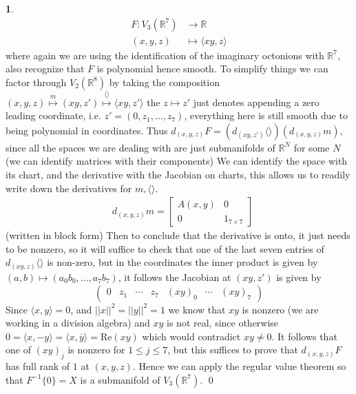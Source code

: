 \documentclass[10.5pt]{article}
\theoremstyle{definition}
\newtheorem{pb}{}
\newcommand{\set}[1]{\{#1\}}
\newcommand{\gen}[1]{\langle#1\rangle}
\newcommand{\norm}[1]{\lvert\lvert#1\rvert\rvert}
\begin{document}
\begin{pb}
\begin{align*}
            F: V_3(\mathbb{R}^7) &\to \mathbb{R} \\
            (x,y,z) &\mapsto \gen{xy,z}
        \end{align*}
        where again we are using the identification of the imaginary octonions with \(\mathbb{R}^7\), also recognize that \(F\) is polynomial hence smooth. To simplify things we can factor through \(V_2(\mathbb{R}^8)\) by taking the composition \((x,y,z) \overset{m}{\mapsto} (xy,z') \overset{\gen{}}{\mapsto} \gen{xy,z'}\) the \(z \mapsto z'\) just denotes appending a zero leading coordinate, i.e. \(z' = (0,z_1,\hdots,z_7)\), everything here is still smooth due to being polynomial in coordinates. Thus \(d_{(x,y,z)}F = (d_{(xy,z')}\gen{})(d_{(x,y,z)}m)\), since all the spaces we are dealing with are just submanifolds of \(\mathbb{R}^N\) for some \(N\) (we can identify matrices with their components) We can identify the space with its chart, and the derivative with the Jacobian on charts, this allows us to readily write down the derivatives for \(m, \gen{}\).
        \begin{align*}
            &d_{(x,y,z)}m = \begin{bmatrix} A(x,y) & 0 \\ 0 & 1_{7 \times 7} \end{bmatrix}
        \end{align*}
        (written in block form) Then to conclude that the derivative is onto, it just needs to be nonzero, so it will suffice to check that one of the last seven entries of \(d_{(xy,z)} \gen{}\) is non-zero, but in the coordinates the inner product is given by \((a,b) \mapsto (a_0b_0,\hdots,a_7b_7)\), it follows the Jacobian at \((xy,z')\) is given by \[\begin{pmatrix} 0&z_1&\cdots&z_7 &(xy)_0 &\cdots &(xy)_7 \end{pmatrix}\]
        Since \(\gen{x,y} = 0\), and \(\norm{x}^2 = \norm{y}^2 = 1\) we know that \(xy\) is nonzero (we are working in a division algebra) and \(xy\) is not real, since otherwise \(0 = \gen{x,-y} = \gen{x, \overline{y}} = \text{Re}(xy)\) which would contradict \(xy \neq 0\). It follows that one of \((xy)_j\) is nonzero for \(1 \leq j \leq 7\), but this suffices to prove that \(d_{(x,y,z)}F\) has full rank of \(1\) at \((x,y,z)\). Hence we can apply the regular value theorem so that \(F^{-1}\set{0} = X\) is a submanifold of \(V_3(\mathbb{R}^7)\). \qed
    \end{pb}
\end{document}
